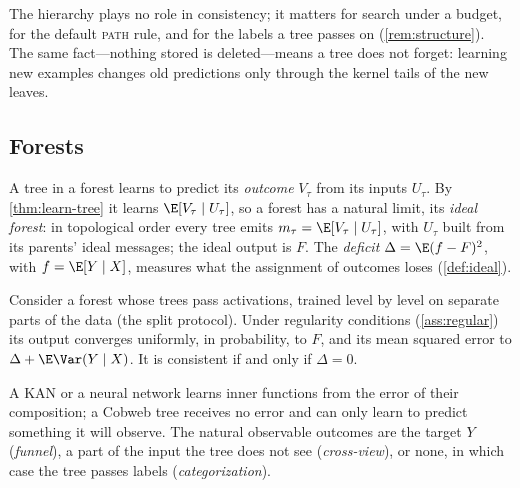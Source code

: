 The hierarchy plays no role in consistency; it matters for search under a budget, for the
default \textsc{path} rule, and for the labels a tree passes on (\cref{rem:structure}).  The
same fact---nothing stored is deleted---means a tree does not forget: learning new examples
changes old predictions only through the kernel tails of the new leaves.

\subsection{Forests}

A tree in a forest learns to predict its \emph{outcome} $V_\tau$ from its inputs $U_\tau$.
By \cref{thm:learn-tree} it learns $\E[V_\tau\mid U_\tau]$, so a forest has a natural limit,
its \emph{ideal forest}: in topological order every tree emits $m_\tau=\E[V_\tau\mid U_\tau]$,
with $U_\tau$ built from its parents' ideal messages; the ideal output is $F$.  The
\emph{deficit} $\Delta=\E(f-F)^2$, with $f=\E[Y\mid X]$, measures what the assignment of
outcomes loses (\cref{def:ideal}).

\begin{theorem}\label{thm:learn-forest}
Consider a forest whose trees pass activations, trained level by level on separate parts
of the data (the split protocol).  Under regularity conditions (\cref{ass:regular}) its
output converges uniformly, in probability, to $F$, and its mean squared error to
$\Delta+\E\Var(Y\mid X)$.  It is consistent if and only if $\Delta=0$.
\end{theorem}

A KAN or a neural network learns inner functions from the error of their composition; a
Cobweb tree receives no error and can only learn to predict something it will observe.  The
natural observable outcomes are the target $Y$ (\emph{funnel}), a part of the input the tree
does not see (\emph{cross-view}), or none, in which case the tree passes labels
(\emph{categorization}).

